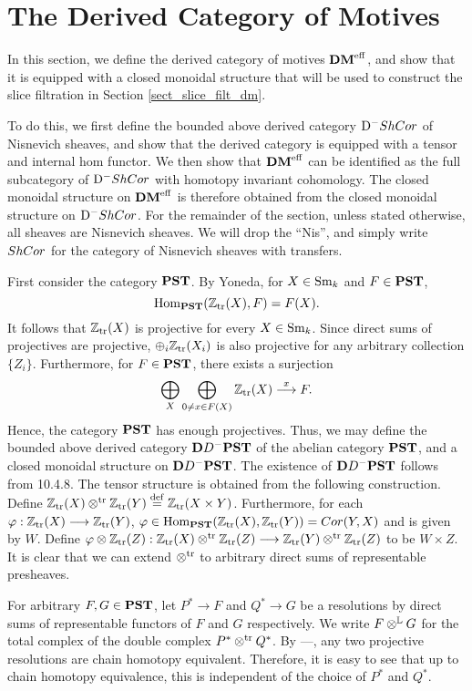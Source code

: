 \newpage
\section{The Derived Category of Motives}\label{sect_dmeff_and_dm}

In this section, we define the derived category of motives $\mathbf{DM}^{\mathrm{eff}}$,
and show that it is equipped with a closed monoidal structure that
will be used to construct the slice filtration in Section 
\ref{sect_slice_filt_dm}.

To do this, we first define the bounded above derived category 
$\mathrm{D}^-ShCor$ of Nisnevich sheaves, and show that the derived 
category is equipped with a tensor and internal hom functor. We 
then show that $\mathbf{DM}^{\mathrm{eff}}$ can be identified as the full subcategory 
of $\mathrm{D}^-ShCor$ with homotopy invariant cohomology. The closed
monoidal structure on $\mathbf{DM}^{\mathrm{eff}}$ is therefore obtained from the
closed monoidal structure on $\mathrm{D}^-ShCor$. For the remainder of the
section, unless stated otherwise, all sheaves are Nisnevich 
sheaves. We will drop the ``Nis'', and simply write $ShCor$ for 
the category of Nisnevich sheaves with transfers.

First consider the category $\mathbf{PST}$. By Yoneda, for $X \in \mathrm{Sm}_{k}$ and
$F \in \mathbf{PST}$,
\[
\mathrm{Hom}_{\mathbf{PST}}(\mathbb{Z}_{\mathrm{tr}}(X), F) = F(X).
\]
It follows that $\mathbb{Z}_{\mathrm{tr}}(X)$ is projective for every $X \in \mathrm{Sm}_{k}$.
Since direct sums of projectives are projective, 
$\oplus_i \mathbb{Z}_{\mathrm{tr}}(X_i)$ is also projective for any arbitrary 
collection $\{Z_i\}$. Furthermore, for $F \in \mathbf{PST}$, there exists 
a surjection
\begin{equation}\label{eq_res_by_rep}
\bigoplus_{X} \bigoplus_{0 \neq x \in F(X)} \mathbb{Z}_{\mathrm{tr}}(X) 
   \stackrel{x}{\longrightarrow} F.
\end{equation}
Hence, the category $\mathbf{PST}$ has enough projectives. Thus, we may 
define the bounded above derived category $\mathbf{D}{D}^-\mathbf{PST}$ of the 
abelian category $\mathbf{PST}$, and a closed monoidal structure on 
$\mathbf{D}{D}^-\mathbf{PST}$. The existence of $\mathbf{D}{D}^-\mathbf{PST}$ follows from 
\cite{WH} 10.4.8. The tensor structure is obtained from the 
following construction. Define $\mathbb{Z}_{\mathrm{tr}}(X) \otimes^{\mathrm{tr}} \mathbb{Z}_{\mathrm{tr}}(Y) \stackrel{\mathrm{def}}{=} 
\mathbb{Z}_{\mathrm{tr}}(X \times Y)$. Furthermore, for each $\varphi: \mathbb{Z}_{\mathrm{tr}}(X) \longrightarrow 
\mathbb{Z}_{\mathrm{tr}}(Y)$, $\varphi \in \mathrm{Hom}_{\mathbf{PST}}(\mathbb{Z}_{\mathrm{tr}}(X), \mathbb{Z}_{\mathrm{tr}}(Y)) = Cor(Y, X)$ 
and is given by $W$. Define $\varphi \otimes \mathbb{Z}_{\mathrm{tr}}(Z): \mathbb{Z}_{\mathrm{tr}}(X) \otimes^{\mathrm{tr}} 
\mathbb{Z}_{\mathrm{tr}}(Z) \longrightarrow \mathbb{Z}_{\mathrm{tr}}(Y) \otimes^{\mathrm{tr}} \mathbb{Z}_{\mathrm{tr}}(Z)$ to be $W \times Z$. It is clear 
that we can extend $\otimes^{\mathrm{tr}}$ to arbitrary direct sums of 
representable presheaves.

For arbitrary $F, G \in \mathbf{PST}$, let $P^* \to F$ and $Q^* \to G$
be a resolutions by direct sums of representable functors of $F$ 
and $G$ respectively. We write $F \otimes^{\mathbb{L}} G$ for the total complex of 
the double complex $P^* \otimes^{\mathrm{tr}} Q^*$. By \cite{WH} ---, any two 
projective resolutions are chain homotopy equivalent. Therefore, 
it is easy to see that up to chain homotopy equivalence, this is 
independent of the choice of $P^*$ and $Q^*$.

